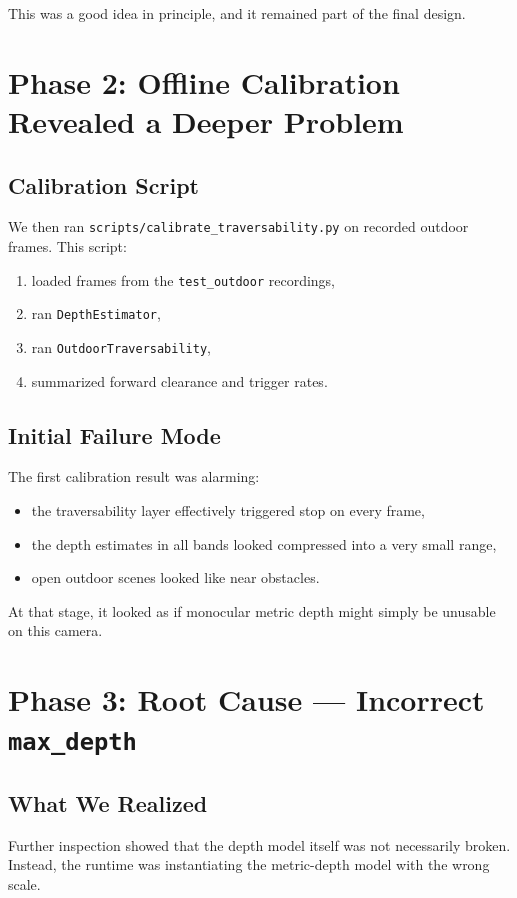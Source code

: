 \documentclass[11pt]{article}
\begin{document}
This was a good idea in principle, and it remained part of the final design.

\section{Phase 2: Offline Calibration Revealed a Deeper Problem}
\subsection{Calibration Script}
We then ran \texttt{scripts/calibrate\_traversability.py} on recorded outdoor frames. This script:
\begin{enumerate}[leftmargin=*]
\item loaded frames from the \texttt{test\_outdoor} recordings,
\item ran \texttt{DepthEstimator},
\item ran \texttt{OutdoorTraversability},
\item summarized forward clearance and trigger rates.
\end{enumerate}

\subsection{Initial Failure Mode}
The first calibration result was alarming:
\begin{itemize}[leftmargin=*]
\item the traversability layer effectively triggered stop on every frame,
\item the depth estimates in all bands looked compressed into a very small range,
\item open outdoor scenes looked like near obstacles.
\end{itemize}

At that stage, it looked as if monocular metric depth might simply be unusable on this camera.

\section{Phase 3: Root Cause --- Incorrect \texttt{max\_depth}}
\subsection{What We Realized}
Further inspection showed that the depth model itself was not necessarily broken. Instead, the runtime was instantiating the metric-depth model with the wrong scale.
\end{document}
